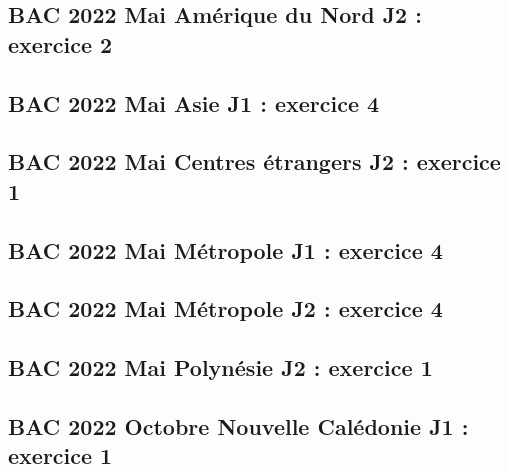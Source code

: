 \documentclass[lang=fr,edition=teacher,layout=sheet]{mxbook}
\begin{document}
\begingroup\endgroup
\par\bigskip
{}\subsection*{BAC 2022 Mai Amérique du Nord J2 : exercice 2}
\begingroup\endgroup
\par\bigskip
{}\subsection*{BAC 2022 Mai Asie J1 : exercice 4}
\begingroup\endgroup
\par\bigskip
{}\subsection*{BAC 2022 Mai Centres étrangers J2 : exercice 1}
\begingroup\endgroup
\par\bigskip
{}\subsection*{BAC 2022 Mai Métropole J1 : exercice 4}
\begingroup\endgroup
\par\bigskip
{}\subsection*{BAC 2022 Mai Métropole J2 : exercice 4}
\begingroup\endgroup
\par\bigskip
{}\subsection*{BAC 2022 Mai Polynésie J2 : exercice 1}
\begingroup\endgroup
\par\bigskip
{}\subsection*{BAC 2022 Octobre Nouvelle Calédonie J1 : exercice 1}
\end{document}
